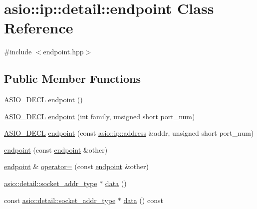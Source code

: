\hypertarget{classasio_1_1ip_1_1detail_1_1endpoint}{}\section{asio\+:\+:ip\+:\+:detail\+:\+:endpoint Class Reference}
\label{classasio_1_1ip_1_1detail_1_1endpoint}


{\ttfamily \#include $<$endpoint.\+hpp$>$}

\subsection*{Public Member Functions}
\begin{DoxyCompactItemize}
\item 
\hyperlink{config_8hpp_ab54d01ea04afeb9a8b39cfac467656b7}{A\+S\+I\+O\+\_\+\+D\+E\+C\+L} \hyperlink{classasio_1_1ip_1_1detail_1_1endpoint_ae9b74e5512dffd8c1345aa920d7b93f6}{endpoint} ()
\item 
\hyperlink{config_8hpp_ab54d01ea04afeb9a8b39cfac467656b7}{A\+S\+I\+O\+\_\+\+D\+E\+C\+L} \hyperlink{classasio_1_1ip_1_1detail_1_1endpoint_abb98e177f94abf87e732a4a5d30bbfce}{endpoint} (int family, unsigned short port\+\_\+num)
\item 
\hyperlink{config_8hpp_ab54d01ea04afeb9a8b39cfac467656b7}{A\+S\+I\+O\+\_\+\+D\+E\+C\+L} \hyperlink{classasio_1_1ip_1_1detail_1_1endpoint_a4baec745d6b53673fe984e068d98e7f0}{endpoint} (const \hyperlink{classasio_1_1ip_1_1address}{asio\+::ip\+::address} \&addr, unsigned short port\+\_\+num)
\item 
\hyperlink{classasio_1_1ip_1_1detail_1_1endpoint_aa1e05e8571b464bcdb98ff7ef00c5ef3}{endpoint} (const \hyperlink{classasio_1_1ip_1_1detail_1_1endpoint}{endpoint} \&other)
\item 
\hyperlink{classasio_1_1ip_1_1detail_1_1endpoint}{endpoint} \& \hyperlink{classasio_1_1ip_1_1detail_1_1endpoint_ae18141845bbc2a921bdba02451c9fdb6}{operator=} (const \hyperlink{classasio_1_1ip_1_1detail_1_1endpoint}{endpoint} \&other)
\item 
\hyperlink{namespaceasio_1_1detail_a40a7b0385a38f87815ffbb8df5e34d05}{asio\+::detail\+::socket\+\_\+addr\+\_\+type} $\ast$ \hyperlink{classasio_1_1ip_1_1detail_1_1endpoint_a9c0c398c537a440aa84bbb891dccfc99}{data} ()
\item 
const \hyperlink{namespaceasio_1_1detail_a40a7b0385a38f87815ffbb8df5e34d05}{asio\+::detail\+::socket\+\_\+addr\+\_\+type} $\ast$ \hyperlink{classasio_1_1ip_1_1detail_1_1endpoint_ab81d42a9af82b6b59a3ebcb0f2007f6b}{data} () const 

\end{DoxyCompactItemize}
